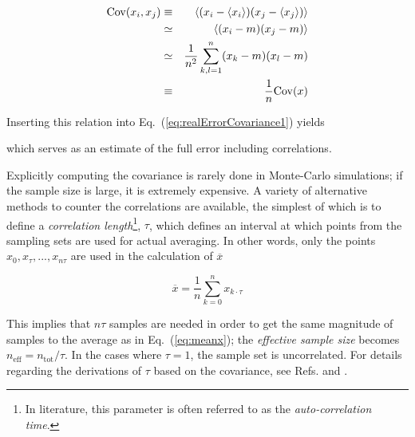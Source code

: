 \begin{eqnarray}
 \mathrm{Cov}(x_i, x_j) &\equiv& \left< (x_i - \left< x_i \right>)(x_j - \left< x_j \right>) \right> \nonumber\\
                &\simeq& \left< (x_i - m)(x_j - m) \right> \nonumber\\
                &\simeq& \frac{1}{n^2}\sum_{k,l=1}^n (x_k-m)(x_l-m) \\
                &\equiv& \frac{1}{n}\mathrm{Cov}(x)
\end{eqnarray}

Inserting this relation into Eq.~(\ref{eq:realErrorCovariance1}) yields


which serves as an estimate of the full error including correlations. 

Explicitly computing the covariance is rarely done in Monte-Carlo simulations; if the sample size is large, it is extremely expensive. A variety of alternative methods to counter the correlations are available, the simplest of which is to define a \textit{correlation length}\footnote{In literature, this parameter is often referred to as the \textit{auto-correlation time}.}, $\tau$, which defines an interval at which points from the sampling sets are used for actual averaging. In other words, only the points $x_0, x_{\tau}, ..., x_{n\tau}$ are used in the calculation of $\overline{x}$

\begin{equation}
 \overline{x} = \frac{1}{n}\sum_{k=0}^n x_{k\cdot\tau}
\end{equation}

This implies that $n\tau$ samples are needed in order to get the same magnitude of samples to the average as in Eq.~(\ref{eq:meanx}); the \textit{effective sample size} becomes $n_\mathrm{eff} = n_\mathrm{tot}/\tau$. In the cases where $\tau = 1$, the sample set is uncorrelated. For details regarding the derivations of $\tau$ based on the covariance, see Refs. \cite{flyvbjerg:461} and \cite{morten}.

